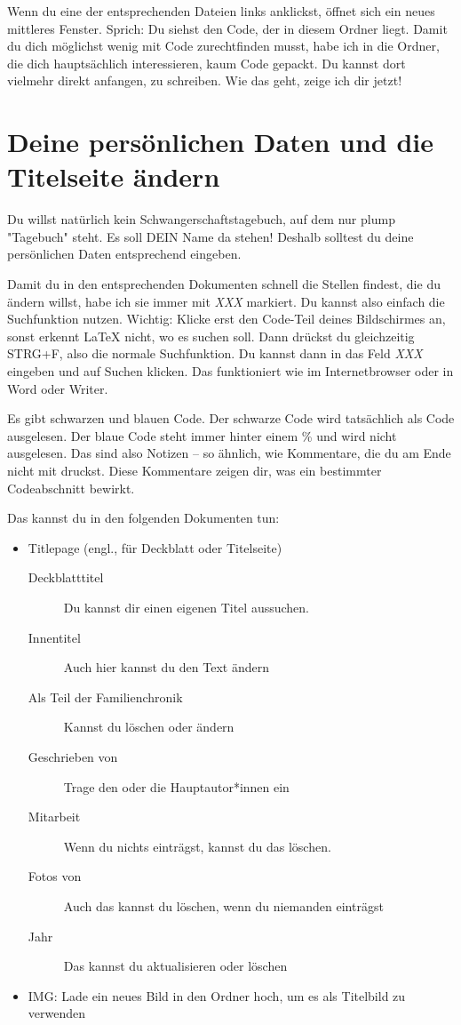 Wenn du eine der entsprechenden Dateien links anklickst, öffnet sich ein neues mittleres Fenster. Sprich: Du siehst den Code, der in diesem Ordner liegt. Damit du dich möglichst wenig mit Code zurechtfinden musst, habe ich in die Ordner, die dich hauptsächlich interessieren, kaum Code gepackt. Du kannst dort vielmehr direkt anfangen, zu schreiben. Wie das geht, zeige ich dir jetzt!

\section{Deine persönlichen Daten und die Titelseite ändern}
Du willst natürlich kein Schwangerschaftstagebuch, auf dem nur plump "Tagebuch" steht. Es soll DEIN Name da stehen! Deshalb solltest du deine persönlichen Daten entsprechend eingeben.\newline

Damit du in den entsprechenden Dokumenten schnell die Stellen findest, die du ändern willst, habe ich sie immer mit \emph{XXX} markiert. Du kannst also einfach die Suchfunktion nutzen. Wichtig: Klicke erst den Code-Teil deines Bildschirmes an, sonst erkennt \LaTeX{} nicht, wo es suchen soll. Dann drückst du gleichzeitig STRG+F, also die normale Suchfunktion. Du kannst dann in das Feld \emph{XXX} eingeben und auf Suchen klicken. Das funktioniert wie im Internetbrowser oder in Word oder Writer.\newline

Es gibt schwarzen und blauen Code. Der schwarze Code wird tatsächlich als Code ausgelesen. Der blaue Code steht immer hinter einem \% und wird nicht ausgelesen. Das sind also Notizen -- so ähnlich, wie Kommentare, die du am Ende nicht mit druckst. Diese Kommentare zeigen dir, was ein bestimmter Codeabschnitt bewirkt.

Das kannst du in den folgenden Dokumenten tun:

\begin{itemize}
\item Titlepage (engl., für Deckblatt oder Titelseite)
\begin{description}
\item[Deckblatttitel] Du kannst dir einen eigenen Titel aussuchen.
\item[Innentitel] Auch hier kannst du den Text ändern
\item[Als Teil der Familienchronik] Kannst du löschen oder ändern
\item[Geschrieben von] Trage den oder die Hauptautor*innen ein
\item[Mitarbeit] Wenn du nichts einträgst, kannst du das löschen.
\item[Fotos von] Auch das kannst du löschen, wenn du niemanden einträgst
\item[Jahr] Das kannst du aktualisieren oder löschen
\end{description}
    \item IMG: Lade ein neues Bild in den Ordner hoch, um es als Titelbild zu verwenden
\end{itemize}


